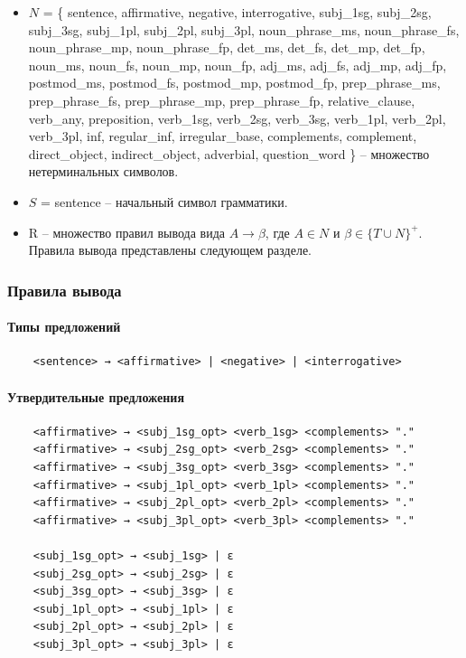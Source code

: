\documentclass[a4paper,final]{article}
\begin{document}
\begin{itemize}
    \item $N$ = \{ sentence, affirmative, negative, interrogative, subj\_1sg, subj\_2sg, subj\_3sg, subj\_1pl, subj\_2pl, subj\_3pl, noun\_phrase\_ms, noun\_phrase\_fs, noun\_phrase\_mp, noun\_phrase\_fp, det\_ms, det\_fs, det\_mp, det\_fp, noun\_ms, noun\_fs, noun\_mp, noun\_fp, adj\_ms, adj\_fs, adj\_mp, adj\_fp, postmod\_ms, postmod\_fs, postmod\_mp, postmod\_fp, prep\_phrase\_ms, prep\_phrase\_fs, prep\_phrase\_mp, prep\_phrase\_fp, relative\_clause, verb\_any, preposition, verb\_1sg, verb\_2sg, verb\_3sg, verb\_1pl, verb\_2pl, verb\_3pl, inf, regular\_inf, irregular\_base, complements, complement, direct\_object, indirect\_object, adverbial, question\_word \} -- множество нетерминальных символов.
    \item $S$ = sentence -- начальный символ грамматики.
    \item R -- множество правил вывода вида $A \rightarrow \beta$, где $A \in N$ и $\beta \in \{T \cup N\}^+$. Правила вывода представлены следующем разделе.
\end{itemize}

\subsubsection{Правила вывода}
\paragraph{Типы предложений}\mbox{}\par
\begin{lstlisting}
    <sentence> → <affirmative> | <negative> | <interrogative>
\end{lstlisting}

\paragraph{Утвердительные предложения}\mbox{}\par
\begin{lstlisting}
    <affirmative> → <subj_1sg_opt> <verb_1sg> <complements> "."
    <affirmative> → <subj_2sg_opt> <verb_2sg> <complements> "."
    <affirmative> → <subj_3sg_opt> <verb_3sg> <complements> "."
    <affirmative> → <subj_1pl_opt> <verb_1pl> <complements> "."
    <affirmative> → <subj_2pl_opt> <verb_2pl> <complements> "."
    <affirmative> → <subj_3pl_opt> <verb_3pl> <complements> "."
    
    <subj_1sg_opt> → <subj_1sg> | ε
    <subj_2sg_opt> → <subj_2sg> | ε
    <subj_3sg_opt> → <subj_3sg> | ε
    <subj_1pl_opt> → <subj_1pl> | ε
    <subj_2pl_opt> → <subj_2pl> | ε
    <subj_3pl_opt> → <subj_3pl> | ε
\end{lstlisting}
\end{document}

